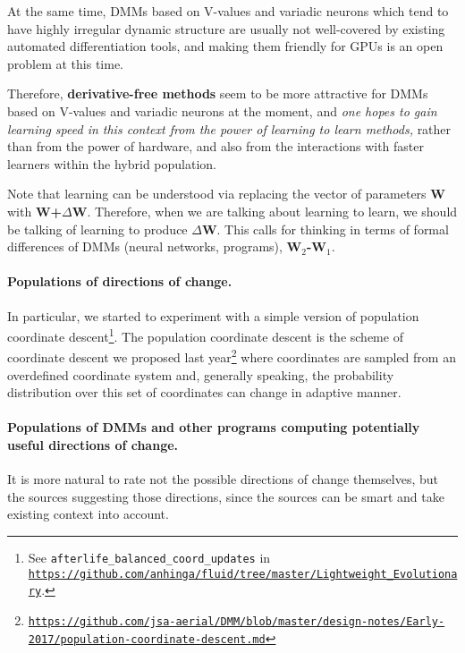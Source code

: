 \documentclass{article}
\begin{document}
At the same time, DMMs based on V-values and variadic neurons which tend to have highly irregular dynamic structure
are usually not well-covered by existing  automated differentiation tools, and making them friendly for GPUs is an open 
problem at this time.

Therefore, {\bf derivative-free methods} seem to be more attractive for DMMs based on V-values and variadic neurons at the moment,
and {\em one hopes to gain learning speed in this context from the power of learning to learn methods,} rather than from the
power of hardware, and also from the interactions with faster learners within the hybrid population.

Note that learning can be understood via replacing the vector of parameters {\bf W} with {\bf W+$\Delta$W}. Therefore,
when we are talking about learning to learn, we should be talking of learning to produce {\bf $\Delta$W}. This calls for thinking
in terms of formal differences of DMMs (neural networks, programs), {\bf W$_2$-W$_1$}.

\paragraph{Populations of directions of change.}
In particular, we started to experiment with a simple version of population coordinate
descent\footnote{See {\tiny\tt afterlife\_balanced\_coord\_updates} in \href{https://github.com/anhinga/fluid/tree/master/Lightweight\_Evolutionary}
{\tiny\tt https://github.com/anhinga/fluid/tree/master/Lightweight\_Evolutionary}.}.
The population coordinate descent is the scheme of coordinate descent we proposed last 
year\footnote{\href{https://github.com/jsa-aerial/DMM/blob/master/design-notes/Early-2017/population-coordinate-descent.md}
{\tiny\tt https://github.com/jsa-aerial/DMM/blob/master/design-notes/Early-2017/population-coordinate-descent.md}} where coordinates are sampled from
an overdefined coordinate system and, generally speaking, the probability distribution over this set of coordinates
can change in adaptive manner.

\paragraph{Populations of DMMs and other programs computing potentially useful directions of change.}
It is more natural to rate not the possible directions of change themselves, but the sources suggesting those directions,
since the sources can be smart and take existing context into account. 
\end{document}

